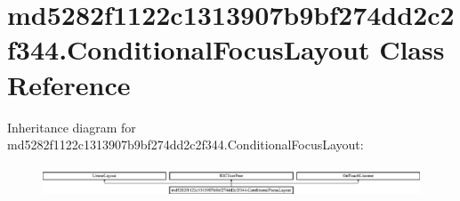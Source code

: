 \hypertarget{classmd5282f1122c1313907b9bf274dd2c2f344_1_1ConditionalFocusLayout}{}\section{md5282f1122c1313907b9bf274dd2c2f344.\+Conditional\+Focus\+Layout Class Reference}
\label{classmd5282f1122c1313907b9bf274dd2c2f344_1_1ConditionalFocusLayout}
Inheritance diagram for md5282f1122c1313907b9bf274dd2c2f344.\+Conditional\+Focus\+Layout\+:\begin{figure}[H]
\begin{center}
\leavevmode
\includegraphics[height=0.938023cm]{classmd5282f1122c1313907b9bf274dd2c2f344_1_1ConditionalFocusLayout}
\end{center}
\end{figure}

